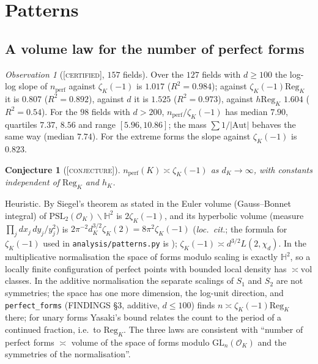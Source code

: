 \documentclass[11pt]{amsart}
\newtheorem{conjecture}[theorem]{Conjecture}
\theoremstyle{definition}
\theoremstyle{remark}
\newtheorem{observation}[theorem]{Observation}
\newcommand{\Hb}{\mathbb{H}}
\newcommand{\OK}{\mathcal{O}_K}
\newcommand{\GL}{\mathrm{GL}}
\newcommand{\PSL}{\mathrm{PSL}}
\newcommand{\Reg}{\mathrm{Reg}_K}
\newcommand{\Aut}{\mathrm{Aut}}
\newcommand{\nperf}{n_{\mathrm{perf}}}
\newcommand{\CERT}{\textsc{[certified]}}
\newcommand{\CONJ}{\textsc{[conjecture]}}
\begin{document}
\section{Patterns}\label{sec:patterns}

\subsection{A volume law for the number of perfect forms}\label{subsec:volume}
\begin{observation}[\CERT, $157$ fields]\label{obs:volume}
Over the $127$ fields with $d\ge100$ the log-log slope of $\nperf$ against $\zeta_K(-1)$ is
$1.017$ ($R^2=0.984$); against $\zeta_K(-1)\Reg$ it is $0.807$ ($R^2=0.892$), against $d$ it is
$1.525$ ($R^2=0.973$), against $h\Reg$ $1.604$ ($R^2=0.54$).  For the $98$ fields with $d>200$,
$\nperf/\zeta_K(-1)$ has median $7.90$, quartiles $7.37$, $8.56$ and range $[5.96,10.86]$; the
mass $\sum1/|\Aut|$ behaves the same way (median $7.74$).  For the extreme forms the slope
against $\zeta_K(-1)$ is $0.823$.
\end{observation}

\begin{conjecture}[\CONJ]\label{conj:volume}
$\nperf(K)\asymp\zeta_K(-1)$ as $d_K\to\infty$, with constants independent of $\Reg$ and $h_K$.
\end{conjecture}

Heuristic.  By Siegel's theorem as stated in \cite[\S1.3, (9)]{Hirzebruch} the Euler volume
(Gauss--Bonnet integral) of $\PSL_2(\OK)\backslash\Hb^2$ is $2\zeta_K(-1)$, and its hyperbolic
volume (measure $\prod_j dx_j\,dy_j/y_j^2$) is $2\pi^{-2}d_K^{3/2}\zeta_K(2)=8\pi^2\zeta_K(-1)$
(\emph{loc.\ cit.}; the formula for $\zeta_K(-1)$ used in \texttt{analysis/patterns.py} is
\cite[\S1.4, (11), (12)]{Hirzebruch}); $\zeta_K(-1)\asymp d^{3/2}L(2,\chi_d)$.  In the
multiplicative normalisation the space of forms modulo scaling is exactly $\Hb^2$, so a
locally finite configuration of perfect points with bounded local density has
$\asymp\mathrm{vol}$ classes.  In the additive normalisation the separate scalings of $S_1$
and $S_2$ are not symmetries; the space has one more dimension, the log-unit direction, and
\texttt{perfect\_forms} (FINDINGS \S3, additive, $d\le100$) finds
$n\asymp\zeta_K(-1)\Reg$ there; for unary forms Yasaki's bound \cite{Yasaki} relates the count
to the period of a continued fraction, i.e.\ to $\Reg$.  The three laws are consistent with
``number of perfect forms $\asymp$ volume of the space of forms modulo $\GL_n(\OK)$ and the
symmetries of the normalisation''.
\end{document}
